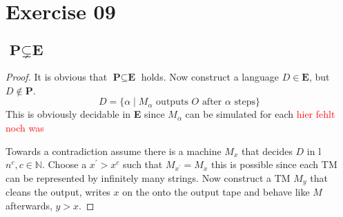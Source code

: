 \documentclass[10pt]{article}
\newcommand{\nice}[1]{\textbf{#1}}
\begin{document}
\section*{Exercise 09}
  \subsection*{$\nice{P}\subsetneq\nice{E}$}
    \begin{proof}
      It is obvious that $\nice{P}\subseteq\nice{E}$ holds. Now construct a
      language $D\in \nice{E}$, but $D\not\in\nice{P}$.
      \begin{displaymath}
        D=\{\alpha \mid \text{$M_{\alpha}$ outputs $O$ after $\alpha$ steps}\}
      \end{displaymath}
      This is obviously decidable in \nice{E} since $M_{\alpha}$ can be
      simulated for each \textcolor{red}{hier fehlt noch was}

      Towards a contradiction assume there is a machine $M_{x}$ that decides
      $D$ in l$n^c, c\in\mathbb{N}$. Choose a $x^\prime>x^c$ such that
      $M_{x^\prime}=M_{x}$ this is possible since each TM can be represented by
      infinitely many strings.
      Now construct a TM $M_{y}$ that cleans the output, writes $x$ on the onto
      the output tape and behave like $M$ afterwards, $y>x$.
    \end{proof}
\end{document}
